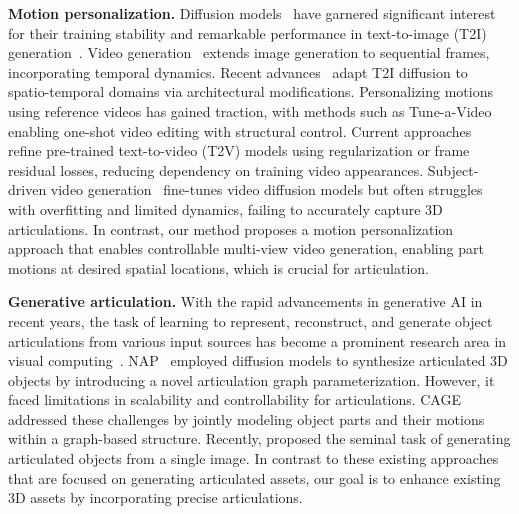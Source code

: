 \vspace{3pt}

\noindent\textbf{Motion personalization.} Diffusion models~\citep{ho2020denoising, song2020denoising, song2020score} have garnered significant interest for their training stability and remarkable performance in text-to-image (T2I) generation~\citep{ramesh2021zero, balaji2022ediffi}. Video generation~\citep{le2021ccvs, yu2023magvit, luo2023videofusion} extends image generation to sequential frames, incorporating temporal dynamics. Recent advances~\citep{singer2022make, zhou2022magicvideo, ge2023preserve, nag2023difftad, alimohammadi2024smite} adapt T2I diffusion to spatio-temporal domains via architectural modifications. Personalizing motions using reference videos has gained traction, with methods such as Tune-a-Video~\citep{tuneavideo} enabling one-shot video editing with structural control. Current approaches~\citep{materzynska2023customizing, jeong2023vmc} refine pre-trained text-to-video (T2V) models using regularization or frame residual losses, reducing dependency on training video appearances. Subject-driven video generation~\citep{dreamix, wu2023lamp, zhao2024motiondirector} fine-tunes video diffusion models but often struggles with overfitting and limited dynamics, failing to accurately capture 3D articulations. In contrast, our method proposes a motion personalization approach that enables controllable multi-view video generation, enabling part motions at desired spatial locations, which is crucial for articulation.

\vspace{3pt}

\noindent\textbf{Generative articulation.} With the rapid advancements in generative AI in recent years, the task of learning to represent, reconstruct, and generate object articulations from various input sources has become a prominent research area in visual computing~\cite{li2024puppet,uzolas2024motiondreamer,le2024articulate}. NAP~\cite{lei2023nap} employed diffusion models to synthesize articulated 3D objects by introducing a novel articulation graph parameterization. However, it faced limitations in scalability and controllability for articulations. CAGE~\cite{liu2024cage} addressed these challenges by jointly modeling object parts and their motions within a graph-based structure. Recently, \cite{liu2024singapo} proposed the seminal task of generating articulated objects from a single image. In contrast to these existing approaches that are focused on generating articulated assets, our goal is to enhance existing 3D assets by incorporating precise articulations.

